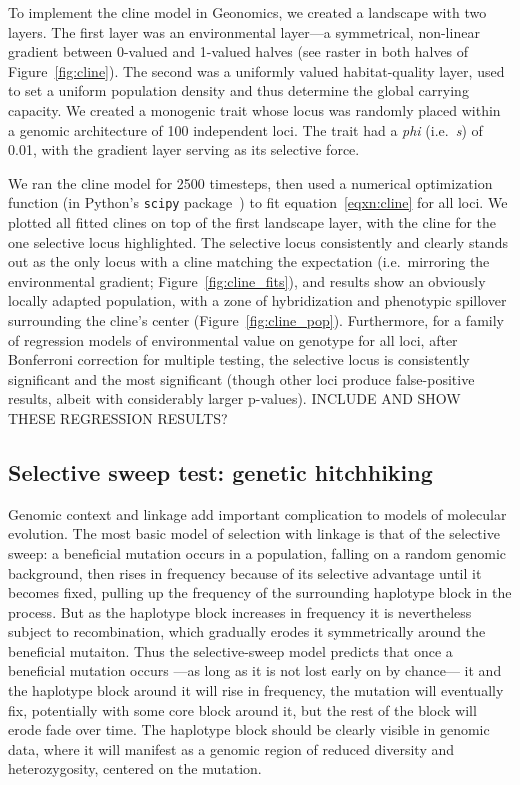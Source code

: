 ﻿\documentclass{article}
\begin{document}
To implement the cline model in Geonomics, we created a landscape with two layers.
The first layer was an environmental layer---a symmetrical, non-linear gradient
between 0-valued and 1-valued halves (see raster in both halves of Figure~\ref{fig:cline}).
The second was a uniformly valued habitat-quality layer, used to set a uniform
population density and thus determine the global carrying capacity.
We created a monogenic trait whose locus was randomly placed within a
genomic architecture of 100 independent loci.
The trait had a \emph{phi} (i.e.\ \emph{s}) of 0.01,
with the gradient layer serving as its selective force.

We ran the cline model for 2500 timesteps, then used a numerical optimization function
(in Python's \texttt{scipy} package~\cite{scipy}) to fit equation~\ref{eqxn:cline} for all loci.
We plotted all fitted clines on top of the first landscape layer,
with the cline for the one selective locus highlighted.
The selective locus consistently and clearly stands out as the only locus with a cline
matching the expectation (i.e.\ mirroring the environmental gradient; Figure~\ref{fig:cline_fits}),
and results show an obviously locally adapted population, with a zone of hybridization
and phenotypic spillover surrounding the cline's center (Figure~\ref{fig:cline_pop}).
Furthermore, for a family of regression models of environmental value
on genotype for all loci, after Bonferroni correction for multiple testing,
the selective locus is consistently significant and the most significant 
(though other loci produce false-positive results, albeit with considerably larger p-values).
INCLUDE AND SHOW THESE REGRESSION RESULTS?


\subsection{Selective sweep test: genetic hitchhiking}
Genomic context and linkage add important complication to models of molecular evolution.
The most basic model of selection with linkage is that of the selective sweep:
a beneficial mutation occurs in a population, falling on a random genomic background,
then rises in frequency because of its selective advantage until it becomes fixed,
pulling up the frequency of the surrounding haplotype block in the process.
But as the haplotype block increases in frequency it is nevertheless subject to recombination,
which gradually erodes it symmetrically around the beneficial mutaiton.
Thus the selective-sweep model predicts that once a beneficial mutation occurs
---as long as it is not lost early on by chance---
it and the haplotype block around it will rise in frequency,
the mutation will eventually fix, potentially with some core block around it,
but the rest of the block will erode fade over time.
The haplotype block should be clearly visible in genomic data,
where it will manifest as a genomic region of reduced diversity and heterozygosity,
centered on the mutation.
\end{document}
